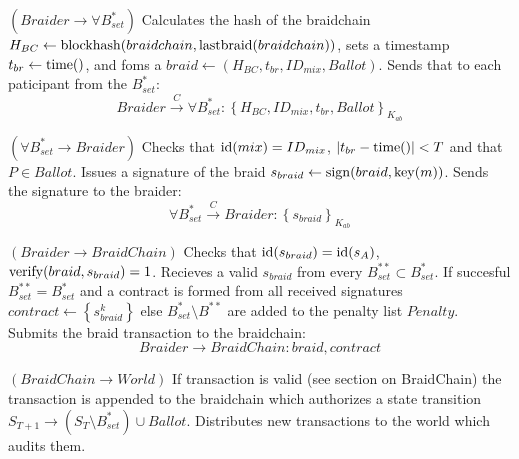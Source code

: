 \documentclass[12pt]{article}
\begin{document}
\begin{steps}
\item $(Braider \to \forall B^*_{set})$ Calculates the hash of the braidchain \\ $H_{BC} \leftarrow
  {\rm blockhash}(braidchain, {\rm lastbraid}(braidchain))$, sets a timestamp $t_{br} \leftarrow {\rm time}()$, and foms a $braid \leftarrow (H_{BC}, t_{br}, ID_{mix}, Ballot)$. Sends that to each paticipant from the $B^*_{set}$:
  \begin{equation}
    Braider \overset{C}{\to} \forall B^*_{set}: \left\{ H_{BC}, ID_{mix}, t_{br}, Ballot \right\}_{K_{ab}}
  \end{equation}
\item $(\forall B^*_{set} \to Braider)$ Checks that ${\rm id}(mix) = ID_{mix}$, $|t_{br} - {\rm time}()|<T$ and that $P \in Ballot$. Issues a signature of the braid $s_{braid} \leftarrow {\rm sign}(braid, {\rm key}(m))$. Sends the signature to the braider:
  \begin{equation}
    \forall B^*_{set} \overset{C}{\to} Braider : \left\{ s_{braid} \right\}_{K_{ab}}
  \end{equation}

\item $(Braider \to BraidChain)$ Checks that ${\rm id}(s_{braid})={\rm id}(s_A)$, ${\rm verify}(braid, s_{braid})=1$. Recieves a valid $s_{braid}$ from every $B^{**}_{set} \subset B^*_{set}$. If succesful $B^{**}_{set} = B^{*}_{set}$ and a contract is formed from all received signatures $contract \leftarrow \left\{ s^k_{braid} \right\}$ else $B^{*}_{set} \setminus B^{**}$ are added to the penalty list $Penalty$. Submits the braid transaction to the braidchain:
  \begin{equation}
    Braider \to BraidChain: braid, contract
  \end{equation}

\item $(BraidChain \to World)$ If transaction is valid (see section on BraidChain) the transaction is appended to the braidchain which authorizes a state transition $S_{T+1} \to (S_T \setminus B^*_{set}) \cup Ballot$. Distributes new transactions to the world which audits them.  %
  
\end{steps}
\end{document}
